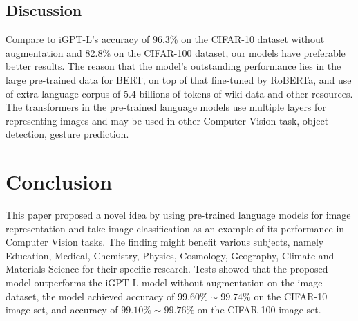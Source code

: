 \documentclass[review]{cvpr}
\begin{document}
\subsection{Discussion}

 Compare to iGPT-L's accuracy of 96.3\% on the CIFAR-10 dataset without augmentation and 82.8\% on the CIFAR-100 dataset, our models have preferable better results.
The reason that the model's outstanding performance lies in the large pre-trained data for BERT, on top of that fine-tuned by RoBERTa, and use of extra language corpus of
$5.4$ billions of tokens of wiki data and other resources.
The transformers in the pre-trained language models use multiple layers for representing images and may be used in other Computer Vision task, \eg object detection, gesture prediction.


\section{Conclusion}

 This paper proposed a novel idea by using pre-trained language models for image representation and take image classification as an example of its performance in Computer Vision tasks.
 The finding might benefit various subjects, namely Education, Medical, Chemistry, Physics, Cosmology, Geography, Climate and Materials Science for their specific research.
Tests showed that the proposed model outperforms the iGPT-L model without augmentation on the image dataset,
the model achieved accuracy of $99.60\%\sim99.74\%$ on the CIFAR-10 image set,
and accuracy of $99.10\%\sim99.76\%$ on the CIFAR-100 image set.


{\small


}
\end{document}
